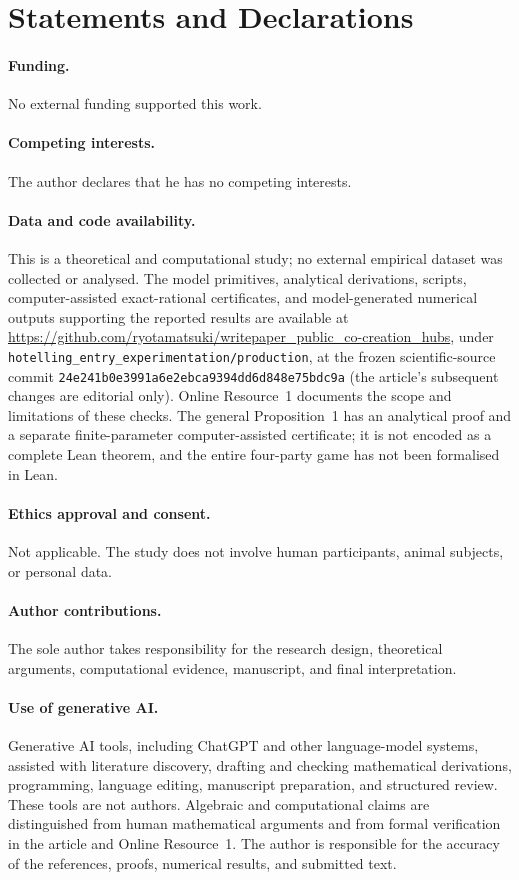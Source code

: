\section*{Statements and Declarations}
\paragraph{Funding.}
No external funding supported this work.

\paragraph{Competing interests.}
The author declares that he has no competing interests.

\paragraph{Data and code availability.}
This is a theoretical and computational study; no external empirical dataset was collected or analysed.
The model primitives, analytical derivations, scripts, computer-assisted exact-rational certificates, and model-generated numerical outputs supporting the reported results are available at
\url{https://github.com/ryotamatsuki/writepaper_public_co-creation_hubs},
under \texttt{hotelling\_entry\_experimentation/production}, at the frozen scientific-source commit \texttt{24e241b0e3991a6e2ebca9394dd6d848e75bdc9a} (the article's subsequent changes are editorial only).
Online Resource~1 documents the scope and limitations of these checks.
The general Proposition~1 has an analytical proof and a separate finite-parameter computer-assisted certificate; it is not encoded as a complete Lean theorem, and the entire four-party game has not been formalised in Lean.

\paragraph{Ethics approval and consent.}
Not applicable. The study does not involve human participants, animal subjects, or personal data.

\paragraph{Author contributions.}
The sole author takes responsibility for the research design, theoretical arguments, computational evidence, manuscript, and final interpretation.

\paragraph{Use of generative AI.}
Generative AI tools, including ChatGPT and other language-model systems, assisted with literature discovery, drafting and checking mathematical derivations, programming, language editing, manuscript preparation, and structured review.
These tools are not authors. Algebraic and computational claims are distinguished from human mathematical arguments and from formal verification in the article and Online Resource~1.
The author is responsible for the accuracy of the references, proofs, numerical results, and submitted text.
